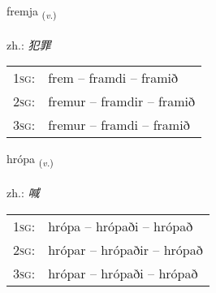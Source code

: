\documentclass[frontgrid, backgrid]{flacards}\usepackage[]{graphicx}\usepackage[]{xcolor}
\begin{document}
\renewcommand{\flhead}{\vskip5pt \fboxsep=0pt {\small\bfseries\footnotesize Sagnorð | 动词}}
\renewcommand{\fcfoot}{\vskip5pt \fboxsep=0pt \hspace{2pt}{\small\bfseries\footnotesize 3K}}

\renewcommand{\blhead}{\vskip5pt {\small\bfseries\footnotesize Sagnorð | 动词 }}
\renewcommand{\bcfoot}{\vskip5pt \hspace{2pt}{\small\bfseries\footnotesize 3K}}


{fremja \small{\textsubscript{(\textit{v.})}} \\[1ex] %
\textphonetic{[frɛmja]} \\
zh.: \emph{犯罪} \\  [2ex]
\renewcommand*{\arraystretch}{0.8}
\begin{tabular}{p{1cm}l}
\textsc{1sg}: & frem -- framdi -- framið \\ 
\textsc{2sg}: & fremur -- framdir -- framið \\ 
\textsc{3sg}: & fremur -- framdi -- framið \\ 
\end{tabular}
}

\renewcommand{\flhead}{\vskip5pt \fboxsep=0pt {\small\bfseries\footnotesize Sagnorð | 动词}}
\renewcommand{\fcfoot}{\vskip5pt \fboxsep=0pt \hspace{2pt}{\small\bfseries\footnotesize 3K}}

\renewcommand{\blhead}{\vskip5pt {\small\bfseries\footnotesize Sagnorð | 动词 }}
\renewcommand{\bcfoot}{\vskip5pt \hspace{2pt}{\small\bfseries\footnotesize 3K}}


{hrópa \small{\textsubscript{(\textit{v.})}} \\[1ex] %
\textphonetic{[r̥ouːpa]} \\
zh.: \emph{喊} \\  [2ex]
\renewcommand*{\arraystretch}{0.8}
\begin{tabular}{p{1cm}l}
\textsc{1sg}: & hrópa -- hrópaði -- hrópað \\ 
\textsc{2sg}: & hrópar -- hrópaðir -- hrópað \\ 
\textsc{3sg}: & hrópar -- hrópaði -- hrópað \\ 
\end{tabular}
}
\end{document}
